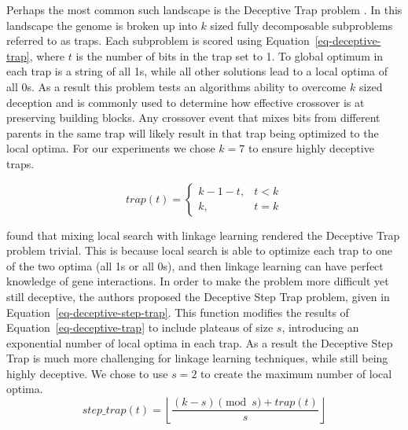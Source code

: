 \documentclass[twoside]{article}
\begin{document}
Perhaps the most common such landscape is the Deceptive Trap problem \citep{goldberg:1991:gasize}.
In this landscape the genome is broken up into $k$ sized fully decomposable subproblems referred
to as traps.
Each subproblem is scored using Equation~\ref{eq-deceptive-trap}, where $t$ is the number of
bits in the trap set to 1. To global optimum in each trap is a string of all 1s, while all
other solutions lead to a local optima of all 0s. As a result this problem tests an algorithms
ability to overcome $k$ sized deception and is commonly used to determine how effective crossover
is at preserving building blocks. Any crossover event that mixes bits from different parents in
the same trap will likely result in that trap being optimized to the local optima. For our experiments
we chose $k=7$ to ensure highly deceptive traps.

\begin{equation}
   trap(t) = \left\{
     \begin{array}{rl}
       k-1-t, &  t<k\\
       k,   &  t = k
     \end{array}
   \right.
  \label{eq-deceptive-trap}
\end{equation}

\cite{goldman:2012:ltga} found that mixing local search with linkage learning rendered the Deceptive
Trap problem trivial. This is because local search is able to optimize each trap to one of the two
optima (all 1s or all 0s), and then linkage learning can have perfect knowledge of gene interactions.
In order to make the problem more difficult yet still deceptive, the authors proposed the Deceptive
Step Trap problem, given in Equation~\ref{eq-deceptive-step-trap}. This function modifies the results
of Equation~\ref{eq-deceptive-trap} to include plateaus of size $s$, introducing an exponential number
of local optima in each trap. As a result the Deceptive Step Trap is much more challenging for linkage
learning techniques, while still being highly deceptive. We chose to use $s=2$ to create the maximum
number of local optima.
\begin{equation}
   step\_trap(t) = \left \lfloor \frac{(k-s)\pmod{s} + trap(t)}{s} \right \rfloor
  \label{eq-deceptive-step-trap}
\end{equation}
\end{document}
